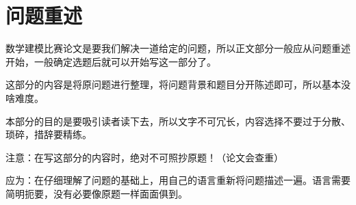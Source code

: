 \section{问题重述}
数学建模比赛论文是要我们解决一道给定的问题，所以正文部分一般应从问题重述开始，一般确定选题后就可以开始写这一部分了。\par
这部分的内容是将原问题进行整理，将问题背景和题目分开陈述即可，所以基本没啥难度。\par
本部分的目的是要吸引读者读下去，所以文字不可冗长，内容选择不要过于分散、琐碎，措辞要精练。\par
注意：在写这部分的内容时，绝对不可照抄原题！（论文会查重）\par
应为：在仔细理解了问题的基础上，用自己的语言重新将问题描述一遍。语言需要简明扼要，没有必要像原题一样面面俱到。
